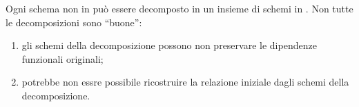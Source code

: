 

Ogni schema non in  pu\`o essere decomposto in un insieme di schemi in . Non tutte le decomposizioni sono ``buone'':
\begin{enumerate}
    \item gli schemi della decomposizione possono non preservare le dipendenze funzionali originali;
    \item potrebbe non essre possibile ricostruire la relazione iniziale dagli schemi della decomposizione.
\end{enumerate}

